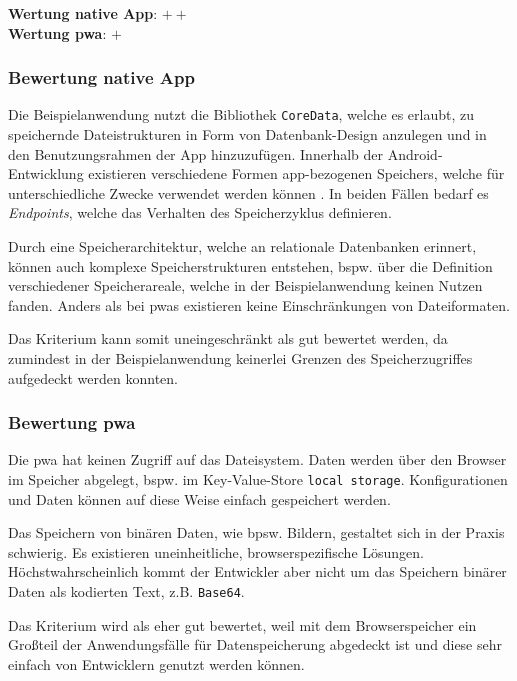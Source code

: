 \textbf{Wertung native App}: $++$\\
\textbf{Wertung \ac{pwa}}: $+$

\subsubsection{Bewertung native App}
Die Beispielanwendung nutzt die Bibliothek \texttt{CoreData}, welche es erlaubt, zu speichernde Dateistrukturen in Form von Datenbank-Design anzulegen und in den Benutzungsrahmen der App hinzuzufügen. Innerhalb der Android-Entwicklung existieren verschiedene Formen app-bezogenen Speichers, welche für unterschiedliche Zwecke verwendet werden können \cite{AndroidStorage}. In beiden Fällen bedarf es \textit{Endpoints}, welche das Verhalten des Speicherzyklus definieren.

Durch eine Speicherarchitektur, welche an relationale Datenbanken erinnert, können auch komplexe Speicherstrukturen entstehen, bspw. über die Definition verschiedener Speicherareale, welche in der Beispielanwendung keinen Nutzen fanden. Anders als bei \acp{pwa} existieren keine Einschränkungen von Dateiformaten.

Das Kriterium kann somit uneingeschränkt als gut bewertet werden, da zumindest in der Beispielanwendung keinerlei Grenzen des Speicherzugriffes aufgedeckt werden konnten.


\subsubsection{Bewertung \ac{pwa}}
Die \ac{pwa} hat keinen Zugriff auf das Dateisystem. Daten werden über den Browser im Speicher abgelegt, bspw. im Key-Value-Store \texttt{local storage}. Konfigurationen und Daten können auf diese Weise einfach gespeichert werden.

Das Speichern von binären Daten, wie  bpsw. Bildern, gestaltet sich in der Praxis schwierig. Es existieren uneinheitliche, browserspezifische Lösungen. Höchstwahrscheinlich kommt der Entwickler aber nicht um das Speichern binärer Daten als kodierten Text, z.B. \texttt{Base64}.

Das Kriterium wird als eher gut bewertet, weil mit dem Browserspeicher ein Großteil der Anwendungsfälle für Datenspeicherung abgedeckt ist und diese sehr einfach von Entwicklern genutzt werden können.